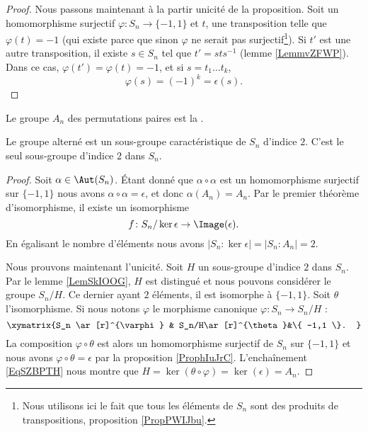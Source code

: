 \begin{proof}
    Nous passons maintenant à la partir unicité de la proposition. Soit un homomorphisme surjectif \( \varphi\colon S_n\to \{ -1,1 \}\) et \( t\), une transposition telle que \( \varphi(t)=-1\) (qui existe parce que sinon \( \varphi\) ne serait pas surjectif\footnote{Nous utilisons ici le fait que tous les éléments de \( S_n\) sont des produits de transpositions, proposition \ref{PropPWIJbu}.}). Si \( t'\) est une autre transposition, il existe \( s\in S_n\) tel que \( t'=sts^{-1}\) (lemme \ref{LemmvZFWP}). Dans ce cas, \( \varphi(t')=\varphi(t)=-1\), et si \( s=t_1\ldots t_k\),
    \begin{equation}
         \varphi(s)=(-1)^k=\epsilon(s).
    \end{equation}
\end{proof}

Le groupe \( A_n\) des permutations paires est la .

\begin{proposition}
    Le groupe alterné est un sous-groupe caractéristique de \( S_n\) d'indice \( 2\). C'est le seul sous-groupe d'indice \( 2\) dans \( S_n\).
\end{proposition}

\begin{proof}
    Soit \( \alpha\in \Aut(S_n)\). Étant donné que \( \alpha\circ\alpha\) est un homomorphisme surjectif sur \( \{ -1,1 \}\) nous avons \( \alpha\circ\alpha=\epsilon\), et donc \( \alpha(A_n)=A_n\). Par le premier théorème d'isomorphisme, il existe un isomorphisme
    \begin{equation}
        f\colon S_n/\ker\epsilon\to \Image(\epsilon).
    \end{equation}
    En égalisant le nombre d'éléments nous avons \( | S_n:\ker\epsilon |=| S_n:A_n |=2\).

    Nous prouvons maintenant l'unicité. Soit \( H\) un sous-groupe d'indice \( 2\) dans \( S_n\). Par le lemme \ref{LemSkIOOG}, \( H\) est distingué et nous pouvons considérer le groupe \( S_n/H\). Ce dernier ayant \( 2\) éléments, il est isomorphe à \( \{ -1,1 \}\). Soit \( \theta\) l'isomorphisme. Si nous notons \( \varphi\) le morphisme canonique \( \varphi\colon S_n\to S_n/H\) :
    \begin{equation}    \label{EqSZBPTH}
        \xymatrix{%
        S_n \ar[r]^{\varphi}        &   S_n/H\ar[r]^{\theta}&\{ -1,1 \}.
           }
    \end{equation}
    La composition \( \varphi\circ \theta\) est alors un homomorphisme surjectif de \( S_n\) sur \( \{ -1,1 \}\) et nous avons \( \varphi\circ\theta=\epsilon\) par la proposition \ref{ProphIuJrC}. L'enchaînement \eqref{EqSZBPTH} nous montre que \( H=\ker(\theta\circ\varphi)=\ker(\epsilon)=A_n\).
\end{proof}

